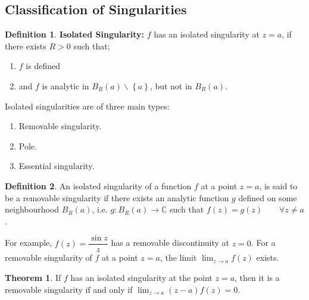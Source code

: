 \documentclass[12pt]{article}
\newcommand{\C}{\mathbb{C}}
\theoremstyle{definition}
\newtheorem{thm}{Theorem}
\newtheorem{defn}{Definition}
\newenvironment{definition}{
\begin{tcolorbox}[colback=green!5!white,colframe=green!75!black, parbox = false]\begin{defn} }{\end{defn}\end{tcolorbox} }
\newenvironment{theorem}{
\begin{tcolorbox}[colback=green!5!white,colframe=green!75!black, parbox = false]\begin{thm} }{\end{thm}\end{tcolorbox} }
\begin{document}
\subsection{Classification of Singularities}

\begin{definition}
    \textbf{Isolated Singularity:} $f$ has an isolated singularity at $z = a$, if there exists $R > 0$ such that;
    \begin{enumerate}
        \item $f$ is defined
        \item and $f$ is analytic in $B_R(a) \backslash \left\{ a\right\}$, but not in $B_R(a)$.
    \end{enumerate}
\end{definition}

Isolated singularities are of three main types:

\begin{enumerate}
    \item Removable singularity.
    \item Pole.
    \item Essential singularity.
\end{enumerate}

\begin{definition}
    An isolated singularity of a function $f$ at a point $z = a$, is said to be a removable singularity if there exists an analytic function $g$ defined on some neighbourhood $B_R(a)$, i.e. $g : B_R(a) \rightarrow \C$ such that $f(z) = g(z)\qquad \forall z \neq a$.
\end{definition}

For example, $f(z) = \dfrac{\sin z}{z}$ has a removable discontinuity at $z = 0$. For a removable singularity of $f$ at a point $z = a$, the limit $\lim_{z \rightarrow a} f(z)$ exists.

\begin{theorem}
    If $f$ has an isolated singularity at the point $z = a$, then it is a removable singularity if and only if $\lim_{z \rightarrow a} (z - a)f(z) = 0$.
\end{theorem}
\end{document}
